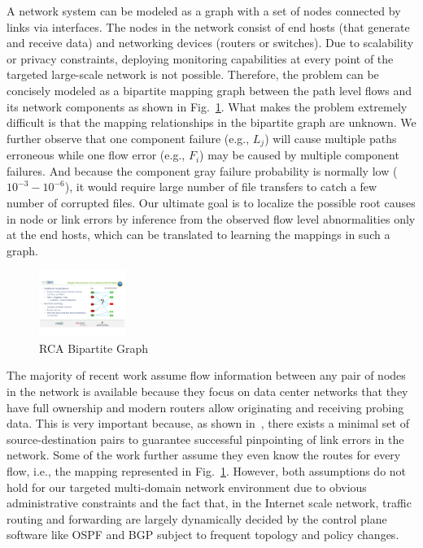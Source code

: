 A network system can be modeled as a graph with a set of nodes connected by links via interfaces. The nodes in the network consist of end hosts (that generate and receive data) and networking devices (routers or switches). Due to scalability or privacy constraints, deploying monitoring capabilities at every point of the targeted large-scale network is not possible. Therefore, the problem can be concisely modeled as a bipartite mapping graph between the path level flows and its network components as shown in Fig.~\ref{fig:bipartite}. What makes the problem extremely difficult is that the mapping relationships in the bipartite graph are unknown. We further observe that one component failure (e.g., $L_j$) will cause multiple paths erroneous while one flow error (e.g., $F_i$) may be caused by multiple component failures. And because the component gray failure probability is normally low ($10^{-3} - 10^{-6}$), it would require large number of file transfers to catch a few number of corrupted files. Our ultimate goal is to localize the possible root causes in node or link errors by inference from the observed flow level abnormalities only at the end hosts, which can be translated to learning the mappings in such a graph.

\begin{figure}
  \begin{center}
    \includegraphics[width=0.25\textwidth]{./figure/RCABipartite}
  \end{center}
  \vspace{-5pt}
\caption{RCA Bipartite Graph}
\vspace{-5pt}
\label{fig:bipartite}
\end{figure}

The majority of recent work assume flow information between any pair of nodes in the network is available because they focus on data center networks that they have full ownership and modern routers allow originating and receiving probing data. This is very important because, as shown in~\cite{netbouncer:nsdi18}, there exists a minimal set of source-destination pairs to guarantee successful pinpointing of link errors in the network. Some of the work further assume they even know the routes for every flow, i.e., the mapping represented in Fig.~\ref{fig:bipartite}. However, both assumptions do not hold for our targeted multi-domain network environment due to obvious administrative constraints and the fact that, in the Internet scale network, traffic routing and forwarding are largely dynamically decided by the control plane software like OSPF and BGP subject to frequent topology and policy changes. 


